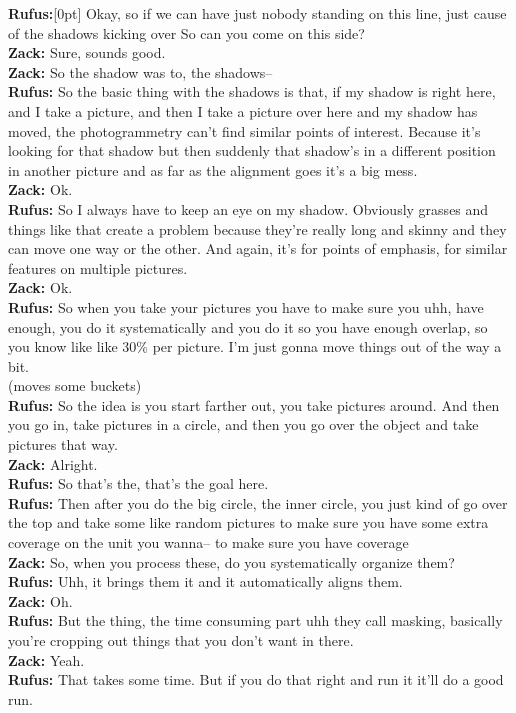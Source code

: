 \documentclass[
]{article}
\newcommand{\paragraphnumber}[1]{\marginnote{\color{lightgray}\tiny{#1}}[0pt]}
\begin{document}
\textbf{Rufus:}\paragraphnumber{[118]} Okay, so if we can have just
nobody standing on this line, just cause of the shadows kicking over So
can you come on this side?\\
\textbf{Zack:} Sure, sounds good.\\
\textbf{Zack:} So the shadow was to, the shadows--\\
\textbf{Rufus:} So the basic thing with the shadows is that, if my
shadow is right here, and I take a picture, and then I take a picture
over here and my shadow has moved, the photogrammetry can't find similar
points of interest. Because it's looking for that shadow but then
suddenly that shadow's in a different position in another picture and as
far as the alignment goes it's a big mess.\\
\textbf{Zack:} Ok.\\
\textbf{Rufus:} So I always have to keep an eye on my shadow. Obviously
grasses and things like that create a problem because they're really
long and skinny and they can move one way or the other. And again, it's
for points of emphasis, for similar features on multiple pictures.\\
\textbf{Zack:} Ok.\\
\textbf{Rufus:} So when you take your pictures you have to make sure you
uhh, have enough, you do it systematically and you do it so you have
enough overlap, so you know like like 30\% per picture. I'm just gonna
move things out of the way a bit.\\
(moves some buckets)\\
\textbf{Rufus:} So the idea is you start farther out, you take pictures
around. And then you go in, take pictures in a circle, and then you go
over the object and take pictures that way.\\
\textbf{Zack:} Alright.\\
\textbf{Rufus:} So that's the, that's the goal here.\\
\textbf{Rufus:} Then after you do the big circle, the inner circle, you
just kind of go over the top and take some like random pictures to make
sure you have some extra coverage on the unit you wanna-- to make sure
you have coverage\\
\textbf{Zack:} So, when you process these, do you systematically
organize them?\\
\textbf{Rufus:} Uhh, it brings them it and it automatically aligns
them.\\
\textbf{Zack:} Oh.\\
\textbf{Rufus:} But the thing, the time consuming part uhh they call
masking, basically you're cropping out things that you don't want in
there.\\
\textbf{Zack:} Yeah.\\
\textbf{Rufus:} That takes some time. But if you do that right and run
it it'll do a good run.
\end{document}
